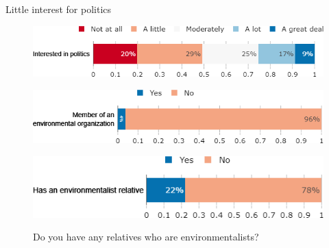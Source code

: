 \begin{framefont}{\small}
\begin{frame}{Little interest for politics}%
\vspace{-.5cm}
\begin{figure}[h!]
\caption{To what extent are you interested in politics?}
\includegraphics[width=.52\paperwidth]{../figures/FR/interested_politics_FR.png} \\
\vspace{.1cm}
\caption{Are you member of an environmental organization?}
\includegraphics[width=.47\paperwidth]{../figures/FR/member_environmental_orga_FR.png}\\
\vspace{.1cm}
\caption{Do you have any relatives who are environmentalists?}
\includegraphics[width=.47\paperwidth]{../figures/FR/relative_environmentalist_FR.png}\\
\end{figure}
\end{frame}


\end{framefont}
